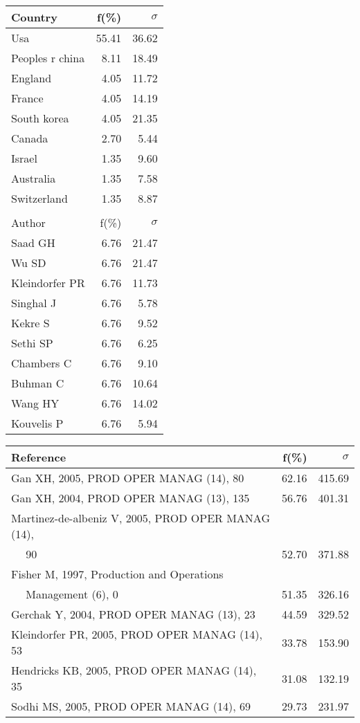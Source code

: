 \documentclass[a4paper,11pt]{report}
\begin{document}
\begin{landscape}
\begin{table}[!ht]
{\begin{tabular}{|l r r|}
\hline
\hline
Country & f(\%) & $\sigma$\\
\hline
Usa & 55.41 & 36.62\\
Peoples r china & 8.11 & 18.49\\
England & 4.05 & 11.72\\
France & 4.05 & 14.19\\
South korea & 4.05 & 21.35\\
Canada & 2.70 & 5.44\\
Israel & 1.35 & 9.60\\
Australia & 1.35 & 7.58\\
Switzerland & 1.35 & 8.87\\
 &  & \\
\hline
\hline
Author & f(\%) & $\sigma$\\
\hline
Saad GH & 6.76 & 21.47\\
Wu SD & 6.76 & 21.47\\
Kleindorfer PR & 6.76 & 11.73\\
Singhal J & 6.76 & 5.78\\
Kekre S & 6.76 & 9.52\\
Sethi SP & 6.76 & 6.25\\
Chambers C & 6.76 & 9.10\\
Buhman C & 6.76 & 10.64\\
Wang HY & 6.76 & 14.02\\
Kouvelis P & 6.76 & 5.94\\
\hline
\end{tabular}
}
{\scriptsize\begin{tabular}{|l r r|}
\hline
Reference & f(\%) & $\sigma$\\
\hline
Gan XH, 2005, PROD OPER MANAG (14), 80 & 62.16 & 415.69\\
Gan XH, 2004, PROD OPER MANAG (13), 135 & 56.76 & 401.31\\
Martinez-de-albeniz V, 2005, PROD OPER MANAG (14), &  & \\
$\quad$ 90 & 52.70 & 371.88\\
Fisher M, 1997, Production and Operations &  & \\
$\quad$ Management (6), 0 & 51.35 & 326.16\\
Gerchak Y, 2004, PROD OPER MANAG (13), 23 & 44.59 & 329.52\\
Kleindorfer PR, 2005, PROD OPER MANAG (14), 53 & 33.78 & 153.90\\
Hendricks KB, 2005, PROD OPER MANAG (14), 35 & 31.08 & 132.19\\
Sodhi MS, 2005, PROD OPER MANAG (14), 69 & 29.73 & 231.97\\

\end{tabular}}
\end{table}
\end{landscape}
\end{document}
